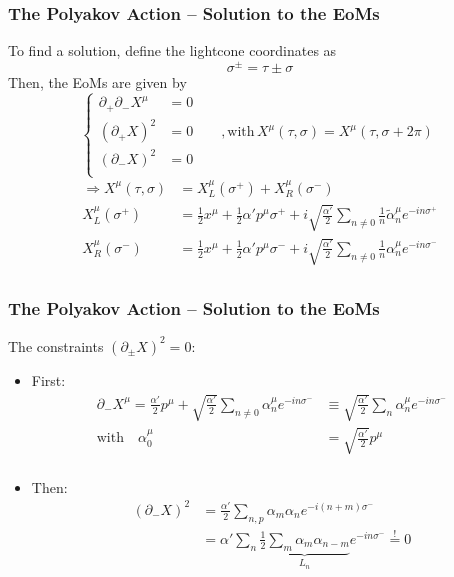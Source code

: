 \documentclass[aspectratio=169]{beamer}
\begin{document}
	\begin{frame}
		\frametitle{The Polyakov Action -- Solution to the EoMs}
		To find a solution, define the lightcone coordinates as
		\begin{equation*}
			\sigma^\pm = \tau\pm\sigma
		\end{equation*}
		Then, the EoMs are given by
		\begin{equation*}
			\begin{cases}
				\partial_+\partial_-X^\mu &= 0 \\
				(\partial_+X)^2 &= 0 \qquad, \text{with} \, X^\mu(\tau,\sigma) = X^\mu(\tau,\sigma+2\pi) \\
				(\partial_-X)^2 &= 0 \\
			\end{cases}
		\end{equation*}
		\begin{align*}
			\Rightarrow X^\mu(\tau,\sigma) & = X^\mu_L(\sigma^+) + X^\mu_R(\sigma^-) \\
			X^\mu_{L}(\sigma^+) &= \frac{1}{2}x^\mu + \frac{1}{2} \alpha' p^\mu \sigma^+ + i\sqrt{\frac{\alpha'}{2}} \sum_{n\neq 0} \frac{1}{n} \tilde{\alpha}^\mu_n e^{-in\sigma^+} \\
			X^\mu_{R}(\sigma^-) &= \frac{1}{2}x^\mu + \frac{1}{2} \alpha' p^\mu \sigma^- + i\sqrt{\frac{\alpha'}{2}} \sum_{n\neq 0} \frac{1}{n} \alpha^\mu_n e^{-in\sigma^-} \\
		\end{align*}
	\end{frame}

	\begin{frame}
		\frametitle{The Polyakov Action -- Solution to the EoMs}
		The constraints $\left(\partial_\pm X\right)^2 = 0$:
		\begin{itemize}
			\item First:
			\begin{align*}
				\partial_- X^\mu = \frac{\alpha'}{2} p^\mu + \sqrt{\frac{\alpha'}{2}} \sum_{n\neq 0 } \alpha^\mu_n e^{-in\sigma^-} & \equiv \sqrt{\frac{\alpha'}{2}} \sum_{n} \alpha^\mu_n e^{-in\sigma^-} \\
				\text{with} \quad \alpha^\mu_0 & = \sqrt{\frac{\alpha'}{2}}p^\mu \\
			\end{align*}
			\item Then:
			\begin{align*}
				\left(\partial_-X\right)^2 &= \frac{\alpha'}{2} \sum_{n,p} \alpha_m \alpha_n e^{-i(n+m)\sigma^-}\\
				& = \alpha' \sum_n \underbrace{\frac{1}{2} \sum_m \alpha_m \alpha_{n-m}}_{L_n} e^{-in\sigma^-} \stackrel{!}{=} 0
			\end{align*}
		\end{itemize}
	\end{frame}
\end{document}
